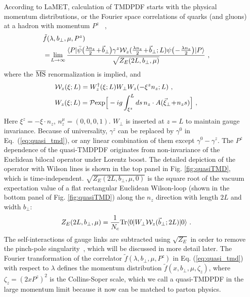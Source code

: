 \documentclass[twocolumn,aps,prd,preprintnumbers,superscriptaddress,10pt]{revtex4-1}
\begin{document}
According to LaMET, calculation of TMDPDF starts with the physical
momentum distributions, or the Fourier space correlations of quarks (and gluons) at
a hadron with momentum $P^z$ ~\cite{Ji:2013dva,Ji:2014gla,Ji:2014hxa,Ji:2018hvs,Ebert:2018gzl,Ebert:2019okf},
\begin{align}\label{eq:quasi_tmd}
& \tilde f(\lambda ,b_\perp,\mu,P^z) \\
&=\! \lim_{L \rightarrow \infty}  \frac{\langle P| \bar \psi\big(\frac{\lambda n_z }{2}\!+\!\vec{b}_\perp\big)\gamma^z{\cal W}_{z}(\frac{\lambda n_z}{2}\!+\!\vec{b}_\perp;L)\psi\big(\!-\!\frac{\lambda n_z}{2}\big) |P\rangle}{\sqrt{Z_E(2L,b_\perp,\mu)}} \ , \nonumber
\end{align}
where the $\overline{\rm MS}$ renormalization is implied, and
\begin{align}\label{eq:staplez}
&{\cal W}_z(\xi;L)=W^{\dagger}_{z}(\xi; L)W_{\perp}W_{z}(-\xi^zn_z;L)  \ ,\\
&W_{z}(\xi;L)= {\cal P}{\rm exp}\Big[-ig\int_{\xi^z}^{L} ds\, n_z\cdot A(\vec{\xi}_\perp\!+\!n_z s)\Big] \ ,
 \end{align}
Here $\xi^z=-\xi\cdot n_z$, $n_z^\mu=(0,0,0,1)$. $W_{\perp}$ is inserted at $z=L$ to maintain gauge invariance.
Because of universality, $\gamma^z$ can be replaced by $\gamma^0$ in Eq.~(\ref{eq:quasi_tmd}), or any linear
combination of them except $\gamma^0-\gamma^z$.
The $P^z$ dependence of the quasi-TMDPDF originates from non-invariance of the Euclidean bilocal operator under Lorentz boost.
The detailed depiction of the operator with Wilson lines is shown in the top panel in Fig. \ref{fig:quasiTMD}, which
is time-independent. $\sqrt{Z_E(2L,b_\perp,\mu,0)}$ is the square root of the vacuum expectation value of a flat rectangular Euclidean Wilson-loop (shown in the bottom panel of Fig. \ref{fig:quasiTMD}) along the $n_z$ direction with length $2L$ and width $b_\perp$:
\begin{align}\label{eq:Z_E}
Z_E(2L,b_\perp,\mu)=\frac{1}{N_c}{\rm Tr}\langle 0|W_{\perp}{\cal W}_z(\vec{b}_\perp;2L)|0\rangle \ .
\end{align}
The self-interactions of gauge links are subtracted using $\sqrt{Z_{E}}$ in order to remove the pinch-pole singularity~\cite{Collins:2008ht,Ji:2019sxk}, which will be discussed in more detail later.
The Fourier transformation of the correlator $\tilde f(\lambda ,b_\perp,\mu,P^z)$ in Eq. (\ref{eq:quasi_tmd})
with respect to $\lambda$ defines the momentum distribution $\tilde f(x,b_\perp,\mu,\zeta_z)$, where $\zeta_z=(2xP^z)^2$ is the Collins-Soper scale,
which we call a quasi-TMDPDF in the large momentum limit because it now can be matched to parton physics.
\end{document}
